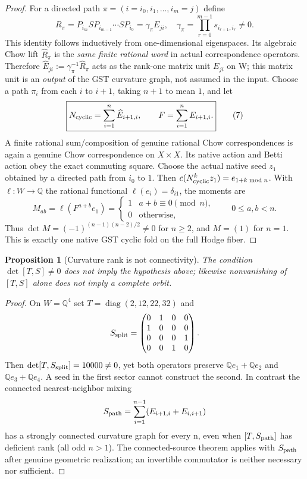 \documentclass[11pt]{article}
\newtheorem{proposition}{Proposition}
\newcommand{\Q}{\mathbb Q}
\begin{document}
\begin{proof}
For a directed path $\pi=(i=i_0,i_1,\ldots,i_m=j)$ define
\[
 R_\pi=P_{i_m}S P_{i_{m-1}}\cdots S P_{i_0}
 =\gamma_\pi E_{ji},\quad
 \gamma_\pi=\prod_{r=0}^{m-1}s_{i_{r+1},i_r}\ne0.
 \tag{6}
\]
This identity follows inductively from one-dimensional eigenspaces. Its algebraic Chow lift $\widehat R_\pi$ is the \emph{same finite rational word} in actual correspondence operators. Therefore
\(\widehat E_{ji}:=\gamma_\pi^{-1}\widehat R_\pi\)
acts as the rank-one matrix unit $E_{ji}$ on W; this matrix unit is an \emph{output} of the GST curvature graph, not assumed in the input.
Choose a path $\pi_i$ from each $i$ to $i+1$, taking $n+1$ to mean $1$, and let
\[
 \boxed{N_{\rm cyclic}=\sum_{i=1}^n \widehat E_{i+1,i},
 \qquad F=\sum_{i=1}^n E_{i+1,i}.} \tag{7}
\]
A finite rational sum/composition of genuine rational Chow correspondences is again a genuine Chow correspondence on $X\times X$. Its native action and Betti action obey the exact commuting square. Choose the actual native seed $z_1$ obtained by a directed path from $i_0$ to $1$. Then
\(c(N_{\rm cyclic}^k z_1)=e_{1+k\bmod n}\).
With $\ell:W\to\Q$ the rational functional $\ell(e_i)=\delta_{i1}$, the moments are
\[
 M_{ab}=\ell(F^{a+b}e_1)=
 \begin{cases}1&a+b\equiv0\pmod n,\\0&\text{otherwise},\end{cases}
 \qquad0\le a,b<n.
\]
Thus $\det M=(-1)^{(n-1)(n-2)/2}\ne0$ for $n\ge2$, and $M=(1)$ for $n=1$. This is exactly one native GST cyclic fold on the full Hodge fiber.
\end{proof}

\begin{proposition}[Curvature rank is not connectivity]
The condition $\det[T,S]\ne0$ does \emph{not} imply the hypothesis above; likewise nonvanishing of $[T,S]$ alone does not imply a complete orbit.
\end{proposition}
\begin{proof}
On $W=\Q^4$ set $T=\operatorname{diag}(2,12,22,32)$ and
\[
 S_{\rm split}=\begin{pmatrix}
 0&1&0&0\\1&0&0&0\\0&0&0&1\\0&0&1&0
 \end{pmatrix}.
\]
Then $\det[T,S_{\rm split}]=10000\ne0$, yet both operators preserve $\Q e_1+\Q e_2$ and $\Q e_3+\Q e_4$. A seed in the first sector cannot construct the second. In contrast the connected nearest-neighbor mixing
\[
 S_{\rm path}=\sum_{i=1}^{n-1}(E_{i+1,i}+E_{i,i+1})
\]
has a strongly connected curvature graph for every n, even when $[T,S_{\rm path}]$ has deficient rank (all odd $n>1$). The connected-source theorem applies with $S_{\rm path}$ after genuine geometric realization; an invertible commutator is neither necessary nor sufficient.
\end{proof}
\end{document}
